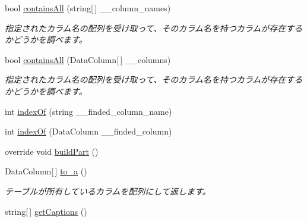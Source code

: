 \begin{DoxyCompactItemize}
bool \hyperlink{classlazurite_1_1pattern_1_1building_1_1_data_column_builder_ae849fb9f8ef479ce8b073acdc8468e47}{containsAll} (string\mbox{[}$\,$\mbox{]} \_\-\_\-column\_\-names)
\begin{DoxyCompactList}\small\item\em 指定されたカラム名の配列を受け取って、そのカラム名を持つカラムが存在するかどうかを調べます。 \item\end{DoxyCompactList}\item 
bool \hyperlink{classlazurite_1_1pattern_1_1building_1_1_data_column_builder_a9ae0b39903799d70dff0cf23c16a03f2}{containsAll} (DataColumn\mbox{[}$\,$\mbox{]} \_\-\_\-columns)
\begin{DoxyCompactList}\small\item\em 指定されたカラム名の配列を受け取って、そのカラム名を持つカラムが存在するかどうかを調べます。 \item\end{DoxyCompactList}\item 
int \hyperlink{classlazurite_1_1pattern_1_1building_1_1_data_column_builder_ad4698f066eb2b013b40307ec533a7a2d}{indexOf} (string \_\-\_\-finded\_\-column\_\-name)
\item 
int \hyperlink{classlazurite_1_1pattern_1_1building_1_1_data_column_builder_a60652f948b08d6727518947a37cf593a}{indexOf} (DataColumn \_\-\_\-finded\_\-column)
\item 
override void \hyperlink{classlazurite_1_1pattern_1_1building_1_1_data_column_builder_a9f5d113f7c726c0ce117255ca6a6b776}{buildPart} ()
\item 
DataColumn\mbox{[}$\,$\mbox{]} \hyperlink{classlazurite_1_1pattern_1_1building_1_1_data_column_builder_a416334d362cadcbf08f23dcc5ad0a469}{to\_\-a} ()
\begin{DoxyCompactList}\small\item\em テーブルが所有しているカラムを配列にして返します。 \item\end{DoxyCompactList}\item 
string\mbox{[}$\,$\mbox{]} \hyperlink{classlazurite_1_1pattern_1_1building_1_1_data_column_builder_aa307041bebf3d3dfacb4bd7e42d76fae}{getCaptions} ()
\end{DoxyCompactItemize}
